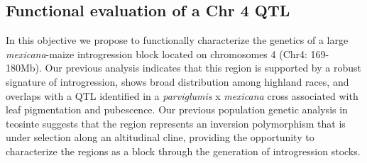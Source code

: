 \subsection{Functional evaluation of a Chr 4 QTL} \label{subsec:nils}

In this objective we propose to functionally characterize the genetics of a large \emph{mexicana}-maize introgression block located on chromosomes 4 (Chr4: 169-180Mb). Our previous analysis \citep{Hufford2013} indicates that this region is supported by a robust signature of introgression, shows broad distribution among highland races, and overlaps with a QTL identified in a \emph{parviglumis} x \emph{mexicana} cross  \citep{Lauter2004a} associated with leaf pigmentation and pubescence. Our previous population genetic analysis in teosinte \citep{Pyhajarvi2013}  suggests that the region represents an inversion polymorphism that is under selection along an altitudinal cline, providing the opportunity to characterize the regions as a block through the generation of introgression stocks. %


